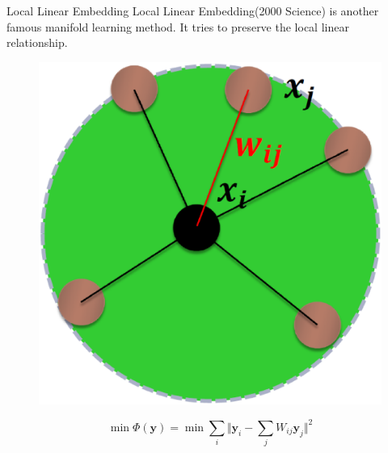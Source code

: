 \documentclass{beamer}
\newcommand{\bol}[1]{\textbf{#1}}
\begin{document}
\begin{darkframes}
    \begin{frame}{Local Linear Embedding}
    \alert{Local Linear Embedding}(2000 Science) is another famous manifold learning method. It tries to preserve the local linear relationship.
    \begin{figure}
    \centering
    \includegraphics[scale=0.15]{./figs/fig8.eps}
    \end{figure}
	\begin{displaymath}
	\min\Phi(\bol{y}) = \min\sum_i\Vert \bol{y}_i - \sum_jW_{ij}\bol{y}_j  \Vert^2
	\end{displaymath}
    \end{frame}
    
    

\end{darkframes}
\end{document}
